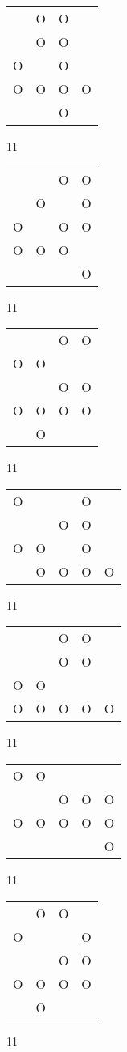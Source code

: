 \begin{tabular}{|m{0.2cm}m{0.2cm}m{0.2cm}m{0.2cm}|}\hline
 &O&O& \\
 &O&O& \\
O& &O& \\
O&O&O&O\\
 & &O& \\
\hline\end{tabular}11
\begin{tabular}{|m{0.2cm}m{0.2cm}m{0.2cm}m{0.2cm}|}\hline
 & &O&O\\
 &O& &O\\
O& &O&O\\
O&O&O& \\
 & & &O\\
\hline\end{tabular}11
\begin{tabular}{|m{0.2cm}m{0.2cm}m{0.2cm}m{0.2cm}|}\hline
 & &O&O\\
O&O& & \\
 & &O&O\\
O&O&O&O\\
 &O& & \\
\hline\end{tabular}11
\begin{tabular}{|m{0.2cm}m{0.2cm}m{0.2cm}m{0.2cm}m{0.2cm}|}\hline
O& & &O& \\
 & &O&O& \\
O&O& &O& \\
 &O&O&O&O\\
\hline\end{tabular}11
\begin{tabular}{|m{0.2cm}m{0.2cm}m{0.2cm}m{0.2cm}m{0.2cm}|}\hline
 & &O&O& \\
 & &O&O& \\
O&O& & & \\
O&O&O&O&O\\
\hline\end{tabular}11
\begin{tabular}{|m{0.2cm}m{0.2cm}m{0.2cm}m{0.2cm}m{0.2cm}|}\hline
O&O& & & \\
 & &O&O&O\\
O&O&O&O&O\\
 & & & &O\\
\hline\end{tabular}11
\begin{tabular}{|m{0.2cm}m{0.2cm}m{0.2cm}m{0.2cm}|}\hline
 &O&O& \\
O& & &O\\
 & &O&O\\
O&O&O&O\\
 &O& & \\
\hline\end{tabular}11
